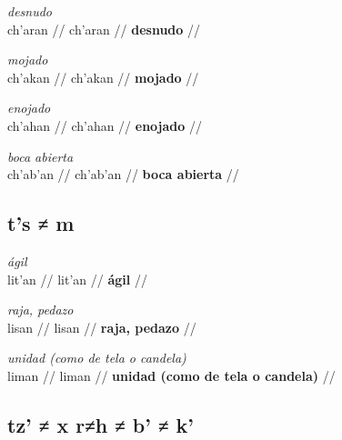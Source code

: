 \documentclass{article}%
\begin{document}
%
\par\medskip%
\ex
\textit{desnudo} \\
\begingl
\gla ch'aran //
\glb ch'aran //
\glc \textbf{desnudo} //
\endgl
\xe
%
\medskip%
\par\medskip%
\ex
\textit{mojado} \\
\begingl
\gla ch'akan //
\glb ch'akan //
\glc \textbf{mojado} //
\endgl
\xe
%
\medskip%
\par\medskip%
\ex
\textit{enojado} \\
\begingl
\gla ch'ahan //
\glb ch'ahan //
\glc \textbf{enojado} //
\endgl
\xe
%
\medskip%
\par\medskip%
\ex
\textit{boca abierta} \\
\begingl
\gla ch'ab'an //
\glb ch'ab'an //
\glc \textbf{boca abierta} //
\endgl
\xe
%
\medskip%
\subsection{t's ≠ m}%
\label{subsec:tsm}%

%
\par\medskip%
\ex
\textit{ágil} \\
\begingl
\gla lit'an //
\glb lit'an //
\glc \textbf{ágil} //
\endgl
\xe
%
\medskip%
\par\medskip%
\ex
\textit{raja, pedazo} \\
\begingl
\gla lisan //
\glb lisan //
\glc \textbf{raja, pedazo} //
\endgl
\xe
%
\medskip%
\par\medskip%
\ex
\textit{unidad (como de tela o candela)} \\
\begingl
\gla liman //
\glb liman //
\glc \textbf{unidad (como de tela o candela)} //
\endgl
\xe
%
\medskip%
\subsection{tz' ≠ x r≠h ≠ b' ≠ k'}%
\label{subsec:tzxrhbk}%
\end{document}

